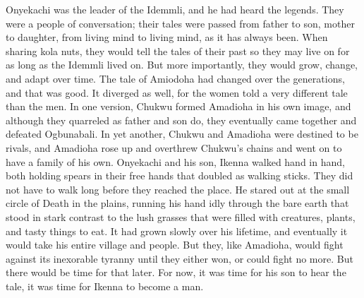 Onyekachi was the leader of the Idemmli, and he had heard the legends. They were a people of conversation; their tales were passed from father to son, mother to daughter, from living mind to living mind, as it has always been. When sharing kola nuts, they would tell the tales of their past so they may live on for as long as the Idemmli lived on. But more importantly, they would grow, change, and adapt over time. The tale of Amiodoha had changed over the generations, and that was good. It diverged as well, for the women told a very different tale than the men. In one version, Chukwu formed Amadioha in his own image, and although they quarreled as father and son do, they eventually came together and defeated Ogbunabali. In yet another, Chukwu and Amadioha were destined to be rivals, and Amadioha rose up and overthrew Chukwu’s chains and went on to have a family of his own.
\SmallVSpace
Onyekachi and his son, Ikenna walked hand in hand, both holding spears in their free hands that doubled as walking sticks. They did not have to walk long before they reached the place. He stared out at the small circle of Death in the plains, running his hand idly through the bare earth that stood in stark contrast to the lush grasses that were filled with creatures, plants, and tasty things to eat. It had grown slowly over his lifetime, and eventually it would take his entire village and people. But they, like Amadioha, would fight against its inexorable tyranny until they either won, or could fight no more.
\SomeVSpace
But there would be time for that later. For now, it was time for his son to hear the tale, it was time for Ikenna to become a man.